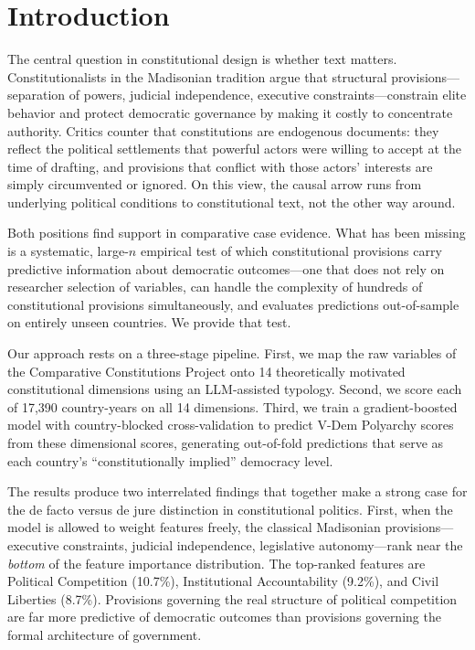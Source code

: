 \documentclass[9pt,twoside]{pnas-new}
\begin{document}
\Endparasplit

\section*{Introduction}

The central question in constitutional design is whether text matters. Constitutionalists in the Madisonian tradition argue that structural provisions---separation of powers, judicial independence, executive constraints---constrain elite behavior and protect democratic governance by making it costly to concentrate authority. Critics counter that constitutions are endogenous documents: they reflect the political settlements that powerful actors were willing to accept at the time of drafting, and provisions that conflict with those actors' interests are simply circumvented or ignored. On this view, the causal arrow runs from underlying political conditions to constitutional text, not the other way around.

Both positions find support in comparative case evidence. What has been missing is a systematic, large-$n$ empirical test of which constitutional provisions carry predictive information about democratic outcomes---one that does not rely on researcher selection of variables, can handle the complexity of hundreds of constitutional provisions simultaneously, and evaluates predictions out-of-sample on entirely unseen countries. We provide that test.

Our approach rests on a three-stage pipeline. First, we map the raw variables of the Comparative Constitutions Project onto 14 theoretically motivated constitutional dimensions using an LLM-assisted typology. Second, we score each of 17,390 country-years on all 14 dimensions. Third, we train a gradient-boosted model with country-blocked cross-validation to predict V-Dem Polyarchy scores from these dimensional scores, generating out-of-fold predictions that serve as each country's ``constitutionally implied'' democracy level.

The results produce two interrelated findings that together make a strong case for the de facto versus de jure distinction in constitutional politics. First, when the model is allowed to weight features freely, the classical Madisonian provisions---executive constraints, judicial independence, legislative autonomy---rank near the \emph{bottom} of the feature importance distribution. The top-ranked features are Political Competition (10.7\%), Institutional Accountability (9.2\%), and Civil Liberties (8.7\%). Provisions governing the real structure of political competition are far more predictive of democratic outcomes than provisions governing the formal architecture of government.
\end{document}
